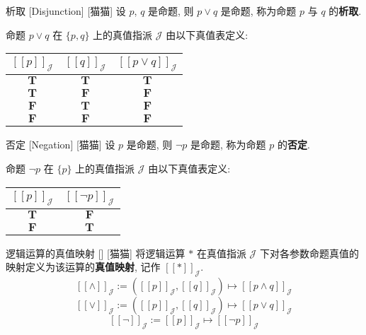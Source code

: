 \documentclass[UTF8]{ctexart}
\newcommand{\LT}{\ensuremath{\mathbf{T}}}
\newcommand{\LF}{\ensuremath{\mathbf{F}}}
\newcommand{\assign}[2]{\ensuremath{{[\![#1]\!]}_{#2}}}
\begin{document}
            \begin{dfn}
                []
                {析取}
                [Disjunction]
                [猫猫]
                设 \(p\), \(q\) 是命题, 则 \(p \lor q\) 是命题, 称为命题 \(p\) 与 \(q\) 的\textbf{析取}. 

                命题 \(p\lor q\) 在 \(\{p,q\}\) 上的真值指派 \(\mathcal{J}\) 由以下真值表定义:
                \begin{center}
                \begin{tabular}{|c|c|c|}
                    \hline
                    \(\assign{p}{\mathcal{J}}\) & \(\assign{q}{\mathcal{J}}\) & \(\assign{p\lor q}{\mathcal{J}}\) \\
                    \hline
                    \LT & \LT & \LT \\
                    \LT & \LF & \LF \\
                    \LF & \LT & \LF \\
                    \LF & \LF & \LF \\
                    \hline
                \end{tabular}
                \end{center}
            \end{dfn}

            \begin{dfn}
                []
                {否定}
                [Negation]
                [猫猫]
                设 \(p\) 是命题, 则 \(\neg p\) 是命题, 称为命题 \(p\) 的\textbf{否定}.

                命题 \(\neg p\) 在 \(\{p\}\) 上的真值指派 \(\mathcal{J}\) 由以下真值表定义:
                \begin{center}
                \begin{tabular}{|c|c|}
                    \hline
                    \(\assign{p}{\mathcal{J}}\) & \(\assign{\neg p}{\mathcal{J}}\) \\
                    \hline
                    \LT & \LF \\
                    \LF & \LT \\
                    \hline
                \end{tabular}
                \end{center}
            \end{dfn}

            \begin{dfn}
                []
                {逻辑运算的真值映射}
                []
                [猫猫]
                将逻辑运算 \(*\) 在真值指派 \(\mathcal{J}\) 下对各参数命题真值的映射定义为该运算的\textbf{真值映射}, 记作 \(\assign{*}{\mathcal{J}}\). 
                \[\assign{\land}{\mathcal{J}}:=(\assign{p}{\mathcal{J}}, \assign{q}{\mathcal{J}})\mapsto\assign{p\land q}{\mathcal{J}}\]
                \[\assign{\lor}{\mathcal{J}}:=(\assign{p}{\mathcal{J}}, \assign{q}{\mathcal{J}})\mapsto\assign{p\lor q}{\mathcal{J}}\]
                \[\assign{\neg}{\mathcal{J}}:=\assign{p}{\mathcal{J}}\mapsto\assign{\neg p}{\mathcal{J}}\]
            \end{dfn}
\end{document}

